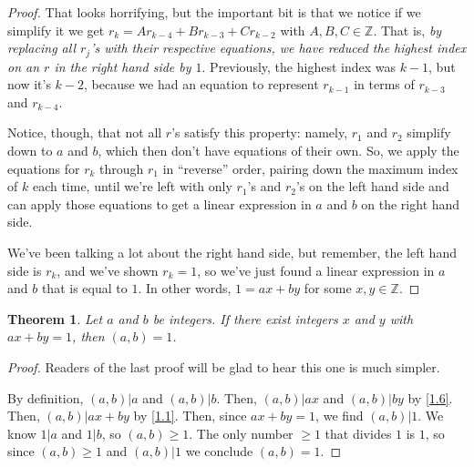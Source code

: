 \documentclass{article}
\newtheorem{thm}{Theorem}[section]
\numberwithin{equation}{thm}
\begin{document}
\begin{proof}
  That looks horrifying, but the important bit is that we notice if we simplify it we get $r_k = Ar_{k-4} + Br_{k-3} + Cr_{k-2}$ with $A, B, C \in \mathbb{Z}$. That is, \emph{by replacing all $r_j$'s with their respective equations, we have reduced the highest index on an $r$ in the right hand side by $1$}. Previously, the highest index was $k-1$, but now it's $k-2$, because we had an equation to represent $r_{k-1}$ in terms of $r_{k-3}$ and $r_{k-4}$.

  Notice, though, that not all $r$'s satisfy this property: namely, $r_1$ and $r_2$ simplify down to $a$ and $b$, which then don't have equations of their own. So, we apply the equations for $r_k$ through $r_1$ in ``reverse'' order, pairing down the maximum index of $k$ each time, until we're left with only $r_1$'s and $r_2$'s on the left hand side and can apply those equations to get a linear expression in $a$ and $b$ on the right hand side.

  We've been talking a lot about the right hand side, but remember, the left hand side is $r_k$, and we've shown $r_k = 1$, so we've just found a linear expression in $a$ and $b$ that is equal to $1$. In other words, $1 = ax + by$ for some $x, y \in \mathbb{Z}$.
\end{proof}



\begin{thm} \label{1.39}
  Let $a$ and $b$ be integers. If there exist integers $x$ and $y$ with $ax + by = 1$, then $(a, b) = 1$.
\end{thm}

\begin{proof}
  Readers of the last proof will be glad to hear this one is much simpler.

  By definition, $(a, b) | a$ and $(a, b) | b$. Then, $(a, b) | ax$ and $(a, b) | by$ by \ref{1.6}. Then, $(a, b) | ax + by$ by \ref{1.1}. Then, since $ax + by = 1$, we find $(a, b) | 1$. We know $1 | a$ and $1 | b$, so $(a, b) \geq 1$. The only number $\geq 1$ that divides $1$ is $1$, so since $(a, b) \geq 1$ and $(a, b) | 1$ we conclude $(a, b) = 1$.
\end{proof}
\end{document}

